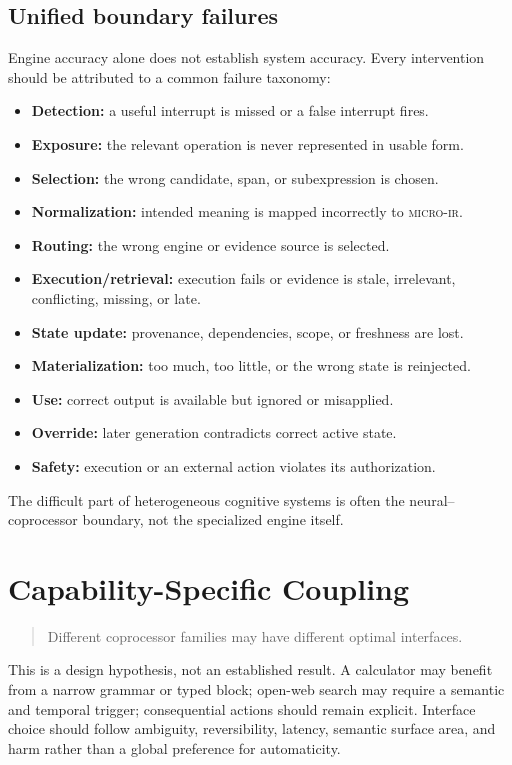 \documentclass[11pt]{article}
\newcommand{\microir}{\textsc{micro-ir}}
\begin{document}
\subsection{Unified boundary failures}

Engine accuracy alone does not establish system accuracy.  Every intervention
should be attributed to a common failure taxonomy:
\begin{itemize}
  \item \textbf{Detection:} a useful interrupt is missed or a false interrupt fires.
  \item \textbf{Exposure:} the relevant operation is never represented in usable form.
  \item \textbf{Selection:} the wrong candidate, span, or subexpression is chosen.
  \item \textbf{Normalization:} intended meaning is mapped incorrectly to \microir{}.
  \item \textbf{Routing:} the wrong engine or evidence source is selected.
  \item \textbf{Execution/retrieval:} execution fails or evidence is stale,
  irrelevant, conflicting, missing, or late.
  \item \textbf{State update:} provenance, dependencies, scope, or freshness are lost.
  \item \textbf{Materialization:} too much, too little, or the wrong state is reinjected.
  \item \textbf{Use:} correct output is available but ignored or misapplied.
  \item \textbf{Override:} later generation contradicts correct active state.
  \item \textbf{Safety:} execution or an external action violates its authorization.
\end{itemize}

The difficult part of heterogeneous cognitive systems is often the
neural--coprocessor boundary, not the specialized engine itself.

\section{Capability-Specific Coupling}

\begin{quote}
Different coprocessor families may have different optimal interfaces.
\end{quote}

This is a design hypothesis, not an established result.  A calculator may
benefit from a narrow grammar or typed block; open-web search may require a
semantic and temporal trigger; consequential actions should remain explicit.
Interface choice should follow ambiguity, reversibility, latency, semantic
surface area, and harm rather than a global preference for automaticity.
\end{document}
